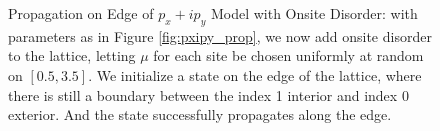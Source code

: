 \documentclass[a4paper]{article}
\begin{document}
\begin{figure}
%
%

%
%
\caption{Propagation on Edge of $p_x + ip_y$ Model with Onsite Disorder: with parameters as in Figure \ref{fig:pxipy_prop}, we now add onsite disorder to the lattice, letting $\mu$ for each site be chosen uniformly at random on $[0.5,3.5]$.
We initialize a state on the edge of the lattice, where there is still a boundary between the index 1 interior and index 0 exterior.
And the state successfully propagates along the edge.
}%
\label{fig:mu_dis_edge_prop}%
\end{figure}
\end{document}
